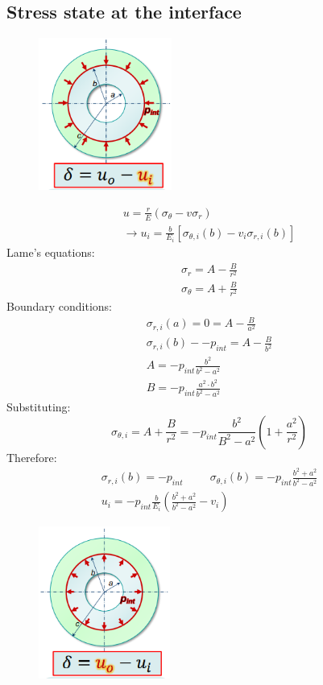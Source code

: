 \documentclass[class=report, crop=false, 12pt,a4paper]{standalone}
\begin{document}
\subsection{Stress state at the interface}
\begin{figure}[H]
    \centering
    \includegraphics[height = 5cm]{../img/diagram123.png}
    \caption{}
\end{figure}
\begin{gather}
    u = \frac{r}{E}\left(\sigma_{\theta} - v \sigma_r\right)\\
    \rightarrow u_i = \frac{b}{E_i}\left[\sigma_{\theta, i} \left(b\right) - v_i \sigma_{r,i} (b)\right]
\end{gather}
Lame's equations:
\begin{gather}
    \sigma_r = A - \frac{B}{r^2}\\
    \sigma_{\theta} = A + \frac{B}{r^2}
\end{gather}
Boundary conditions:
\begin{gather}
    \sigma_{r,i}(a) = 0 = A - \frac{B}{a^2}\\
    \sigma_{r,i}(b) - -p_{int} = A - \frac{B}{b^2}\\
    A = -p_{int}\frac{b^2}{b^2 - a^2}\\
    B = -p_{int}\frac{a^2 \cdot b^2}{b^2 - a^2}
\end{gather}
Substituting:
\begin{equation}
    \sigma_{\theta,i} = A + \frac{B}{r^2} = -p_{int}\frac{b^2}{B^2 - a^2} \left(1 + \frac{a^2}{r^2}\right)
\end{equation}
Therefore:
\begin{gather}
    \sigma_{r,i}(b) = -p_{int} \hspace{1cm} \sigma_{\theta,i}(b) = -p_{int}\frac{b^2 + a^2}{b^2 - a^2}\\
    u_i = -p_{int} \frac{b}{E_i} \left(\frac{b^2 + a^2}{b^2 - a^2} - v_i\right)
\end{gather}
\begin{figure}[H]
    \centering
    \includegraphics[height = 5cm]{../img/diagram124.png}
    \caption{}
\end{figure}
\end{document}
